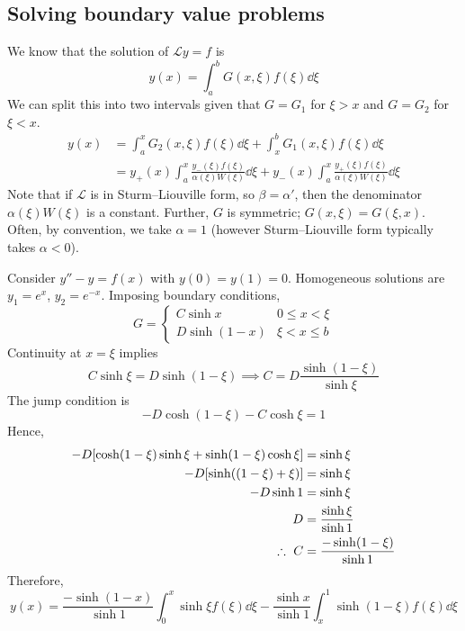 \subsection{Solving boundary value problems}
We know that the solution of \( \mathcal L y = f \) is
\[
	y(x) = \int_a^b G(x,\xi) f(\xi) \dd{\xi}
\]
We can split this into two intervals given that \( G = G_1 \) for \( \xi > x \) and \( G = G_2 \) for \( \xi < x \).
\begin{align*}
	y(x) & = \int_a^x G_2(x,\xi) f(\xi) \dd{\xi} + \int_x^b G_1(x,\xi) f(\xi) \dd{\xi}                                                               \\
	     & = y_+(x) \int_a^x \frac{y_-(\xi) f(\xi)}{\alpha(\xi)W(\xi)} \dd{\xi} + y_-(x) \int_a^x \frac{y_+(\xi) f(\xi)}{\alpha(\xi)W(\xi)} \dd{\xi}
\end{align*}
Note that if \( \mathcal L \) is in Sturm--Liouville form, so \( \beta = \alpha' \), then the denominator \( \alpha(\xi)W(\xi) \) is a constant.
Further, \( G \) is symmetric; \( G(x,\xi) = G(\xi,x) \).
Often, by convention, we take \( \alpha = 1 \) (however Sturm--Liouville form typically takes \( \alpha < 0 \)).
\begin{example}
	Consider \( y'' - y = f(x) \) with \( y(0) = y(1) = 0 \).
	Homogeneous solutions are \( y_1 = e^x \), \( y_2 = e^{-x} \).
	Imposing boundary conditions,
	\[
		G = \begin{cases}
			C \sinh x    & 0 \leq x < \xi \\
			D \sinh(1-x) & \xi < x \leq b
		\end{cases}
	\]
	Continuity at \( x = \xi \) implies
	\[
		C \sinh \xi = D \sinh (1 - \xi) \implies C = D \frac{\sinh (1-\xi)}{\sinh \xi}
	\]
	The jump condition is
	\[
		-D \cosh(1-\xi) - C \cosh \xi = 1
	\]
	Hence,
	\begin{align*}
		-D\qty[\cosh(1-\xi)\sinh \xi + \sinh(1-\xi)\cosh \xi] & = \sinh \xi                     \\
		-D\qty[\sinh((1-\xi) + \xi)]                          & = \sinh \xi                     \\
		-D\sinh 1                                             & = \sinh \xi                     \\
		D                                                     & = \frac{\sinh \xi}{\sinh 1}     \\
		\therefore\ C                                          & = \frac{-\sinh(1-\xi)}{\sinh 1}
	\end{align*}
	Therefore,
	\[
		y(x) = \frac{-\sinh(1-x)}{\sinh 1} \int_0^x \sinh \xi f(\xi) \dd{\xi} - \frac{\sinh x}{\sinh 1} \int_x^1 \sinh (1-\xi) f(\xi) \dd{\xi}
	\]
\end{example}
